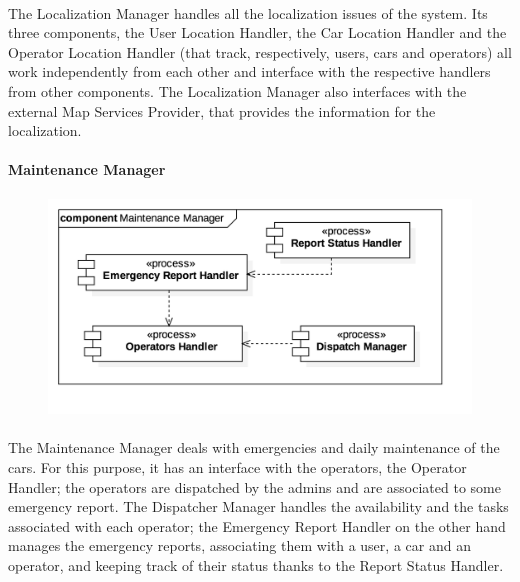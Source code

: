 		\paragraph{} The Localization Manager handles all the localization issues of the system. Its three components, the User Location Handler, the Car Location Handler and the Operator Location Handler (that track, respectively, users, cars and operators) all work independently from each other and interface with the respective handlers from other components. The Localization Manager also interfaces with the external Map Services Provider, that provides the information for the localization.
\FloatBarrier		
		
		
		\paragraph{Maintenance Manager}
			\begin{figure}[h]
				\includegraphics[scale=0.4, center]{img/component_diagrams/06_maintenance_manager.png}
			\end{figure}
		
		\paragraph{} The Maintenance Manager deals with emergencies and daily maintenance of the cars. For this purpose, it has an interface with the operators, the Operator Handler; the operators are dispatched by the admins and are associated to some emergency report. The Dispatcher Manager handles the availability and the tasks associated with each operator; the Emergency Report Handler on the other hand manages the emergency reports, associating them with a user, a car and an operator, and keeping track of their status thanks to the Report Status Handler.

\FloatBarrier		
		
